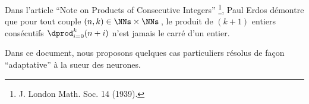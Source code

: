Dans l'article \enquote{Note on Products of Consecutive Integers}
\footnote{
	J. London Math. Soc. 14 (1939).
},
Paul Erdos démontre que pour tout couple $(n, k) \in \NNs \times \NNs$\,, le produit de $(k+1)$ entiers consécutifs $\dprod_{i = 0}^{k} (n + i)$ n'est jamais le carré d'un entier. 

\medskip

Dans ce document, nous proposons quelques cas particuliers résolus de façon \enquote{adaptative} à la sueur des neurones.

